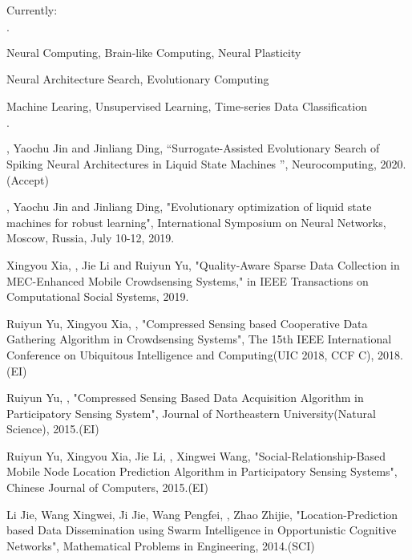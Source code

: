 \documentclass{joel_cv}
\begin{document}
\begin{cvHeader}
\end{cvHeader}


%
%

Currently:
\begin{sectionItemize}{$\cdot$}
	\item Neural Computing, Brain-like Computing, Neural Plasticity
    \item Neural Architecture Search, Evolutionary Computing
    \item Machine Learing, Unsupervised Learning, Time-series Data Classification
\end{sectionItemize}

%
%

\begin{sectionItemize}{$\cdot$}
	\item {}, Yaochu Jin and Jinliang Ding, “Surrogate-Assisted Evolutionary Search of Spiking Neural Architectures in Liquid State Machines ”, Neurocomputing, 2020.(Accept)
    \item {}, Yaochu Jin and Jinliang Ding, "Evolutionary optimization of liquid state machines for robust learning", International Symposium on Neural Networks, Moscow, Russia, July 10-12, 2019.
    \item Xingyou Xia, , Jie Li and Ruiyun Yu, "Quality-Aware Sparse Data Collection in MEC-Enhanced Mobile Crowdsensing Systems," in IEEE Transactions on Computational Social Systems, 2019.
    \item Ruiyun Yu, Xingyou Xia, , "Compressed Sensing based Cooperative Data Gathering Algorithm in Crowdsensing Systems", The 15th IEEE International Conference on Ubiquitous Intelligence and Computing(UIC 2018, CCF C), 2018.(EI)
	\item Ruiyun Yu, , "Compressed Sensing Based Data Acquisition Algorithm in Participatory Sensing System", Journal of Northeastern University(Natural Science), 2015.(EI)
	\item Ruiyun Yu, Xingyou Xia, Jie Li, , Xingwei Wang, "Social-Relationship-Based Mobile Node Location Prediction Algorithm in Participatory Sensing Systems", Chinese Journal of Computers, 2015.(EI)
    \item Li Jie, Wang Xingwei, Ji Jie, Wang Pengfei, , Zhao Zhijie, "Location-Prediction based Data Dissemination using Swarm Intelligence in Opportunistic Cognitive Networks", Mathematical Problems in Engineering, 2014.(SCI)
\end{sectionItemize}
\end{document}
